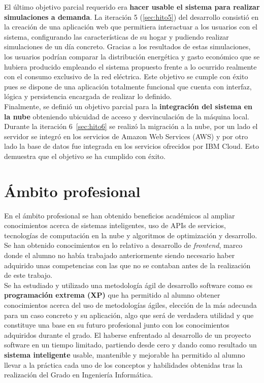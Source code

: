 El último objetivo parcial requerido era \textbf{hacer usable el sistema para realizar simulaciones a demanda}. La iteración 5 (\ref{sec:hito5}) del desarrollo consistió en la creación de una aplicación web que permitiera interactuar a los usuarios con el sistema, configurando las características de su hogar y pudiendo realizar simulaciones de un día concreto. Gracias a los resultados de estas simulaciones, los usuarios podrían comparar la distribución energética y gasto económico que se hubiera producido empleando el sistema propuesto frente a lo ocurrido realmente con el consumo exclusivo de la red eléctrica. Este objetivo se cumple con éxito pues se dispone de una aplicación totalmente funcional que cuenta con interfaz, lógica y persistencia encargada de realizar lo definido.\\

Finalmente, se definió un objetivo parcial para la \textbf{integración del sistema en la nube} obteniendo ubicuidad de acceso y desvinculación de la máquina local. Durante la iteración 6~\ref{sec:hito6} se realizó la migración a la nube, por un lado el servidor se integró en los servicios de Amazon Web Services (AWS) y por otro lado la base de datos fue integrada en los servicios ofrecidos por IBM Cloud. Esto demuestra que el objetivo se ha cumplido con éxito.\\
\section{Ámbito profesional}
En el ámbito profesional se han obtenido beneficios académicos al ampliar conocimientos acerca de sistemas inteligentes, uso de APIs de servicios, tecnologías de computación en la nube y algoritmos de optimización y desarrollo. Se han obtenido conocimientos en lo relativo a desarrollo de \textit{frontend}, marco donde el alumno no había trabajado anteriormente siendo necesario haber adquirido unas competencias con las que no se contaban antes de la realización de este trabajo.\\
Se ha estudiado y utilizado una metodología ágil de desarrollo software como es \textbf{programación extrema (XP)} que ha permitido al alumno obtener conocimientos acerca del uso de metodologías ágiles, elección de la más adecuada para un caso concreto y su aplicación, algo que será de verdadera utilidad y que constituye una base en su futuro profesional junto con los conocimientos adquiridos durante el grado. El haberse enfrentado al desarrollo de un proyecto software en un tiempo limitado, partiendo desde cero y dando como resultado un \textbf{sistema inteligente} usable, mantenible y mejorable ha permitido al alumno llevar a la práctica cada uno de los conceptos y habilidades obtenidas tras la realización del Grado en Ingeniería Informática.\\

